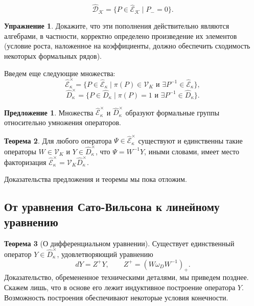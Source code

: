 \documentclass{article}
\theoremstyle{definition}
\newtheorem{theorem}{Теорема}[section]
\theoremstyle{definition} %
\theoremstyle{remark}     %
\theoremstyle{definition}
\theoremstyle{definition}
\theoremstyle{definition}
\theoremstyle{definition}
\theoremstyle{definition}
\newtheorem{proposition}[theorem]{Предложение}
\theoremstyle{definition}
\theoremstyle{definition}
\theoremstyle{definition}
\newtheorem{exercise}{Упражнение}[section]
\begin{document}
\[
\hat{\mathcal{D}}_\mathcal{K} = \{ P \in \hat{\mathcal{E}}_\mathcal{K} \mid P_- = 0 \}.
\]

\begin{exercise}
  Докажите, что эти пополнения действительно являются алгебрами, в частности, корректно определено произведение их элементов (условие роста, наложенное на коэффициенты, должно обеспечить сходимость некоторых формальных рядов).

\end{exercise}

Введем еще следующие множества:
\[
\hat{\mathcal{E}}_\kappa^\times = \{P \in \hat{\mathcal{E}}_\kappa \mid \pi(P) \in \mathcal{V}_K \text{ и } \exists P^{-1} \in \hat{\mathcal{E}}_\kappa\},
\]
\[
\hat{D}_\kappa^\times = \{P \in \hat{D}_\kappa \mid \pi(P) = 1 \text{ и } \exists P^{-1} \in \hat{D}_\kappa\}.
\]

\begin{proposition}
  Множества \(\hat{\mathcal{E}}_\kappa^\times\) и \(\hat{D}_\kappa^\times\) образуют формальные группы относительно умножения операторов.
\end{proposition}

\begin{theorem}
  Для любого оператора \(\Psi \in \hat{\mathcal{E}}_\kappa^\times\) существуют и единственны такие операторы \(W \in \mathcal{V}_K\) и \(Y \in \hat{D}_\kappa^\times\), что \(\Psi = W^{-1}Y\), иными словами, имеет место факторизация \(\hat{\mathcal{E}}_\kappa^\times = \mathcal{V}_K \hat{D}_\kappa^\times\).
\end{theorem}

Доказательства предложения и теоремы мы пока отложим.








\subsection{От уравнения Сато-Вильсона к линейному уравнению}
\begin{theorem}[О дифференциальном уравнении]
  Существует единственный оператор \( Y \in \hat{D}_{\kappa}^{\times} \), удовлетворяющий уравнению
  \[
    dY = Z^{+}Y, \qquad Z^{+} = (W\omega_{D}W^{-1})_{+}.
  \]
  Доказательство, обремененное техническими деталями, мы приведем позднее. Скажем лишь, что в основе его лежит индуктивное построение оператора \( Y \). Возможность построения обеспечивают некоторые условия конечности.
\end{theorem}
\end{document}
